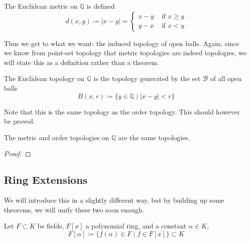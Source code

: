     \begin{definition}
      The Euclidean metric on $\mathbb{Q}$ is defined 
      \begin{equation}
        d(x, y) \coloneqq |x - y| = \begin{cases} x - y & \text{ if } x \geq y \\ y - x & \text{ if } x < y \end{cases}
      \end{equation}
    \end{definition}

    Thus we get to what we want: the induced topology of open balls. 
    Again, since we know from point-set topology that metric topologies are indeed topologies, we will state this as a definition rather than a theorem.  

    \begin{definition}
      The Euclidean topology on $\mathbb{Q}$ is the topology generated by the set $\mathscr{B}$ of all open balls
      \begin{equation}
        B(x, r) \coloneqq \{ y \in \mathbb{Q} \mid |x - y| < r \}
      \end{equation} 
    \end{definition}

    Note that this is the same topology as the order topology. This should however be proved. 

    \begin{theorem}
      The metric and order topologies on $\mathbb{Q}$ are the same topologies. 
    \end{theorem}
    \begin{proof}
      
    \end{proof}

\subsection{Ring Extensions}

  We will introduce this in a slightly different way, but by building up some theorems, we will unify these two soon enough. 
  
  \begin{definition} 
    Let $F \subset K$ be fields, $F[x]$ a polynomial ring, and a constant $\alpha \in K$, 
    \begin{equation}
      F[\alpha] \coloneqq \{ f(\alpha) \in F \mid f \in F[x]\} \subset K
    \end{equation}
  \end{definition} 

